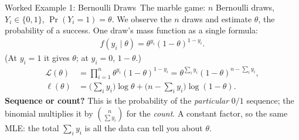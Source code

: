 \documentclass[aspectratio=169,11pt,xcolor=dvipsnames]{beamer}
\newcommand{\lik}{\mathcal{L}}
\newcommand{\loglik}{\ell}
\newcommand{\core}{\,\raisebox{0.6pt}{\textcolor{corestar}{$\bigstar$}}}
\begin{document}
\begin{frame}{Worked Example 1: Bernoulli Draws\core}
The marble game: $n$ Bernoulli draws, $Y_i \in \{0,1\}$,
$\Pr(Y_i=1)=\theta$. We observe the $n$ draws and estimate $\theta$, the
probability of a success. One draw's mass function as a single formula:
\begin{align*}
  f(y_i\mid\theta) = \theta^{y_i}(1-\theta)^{1-y_i} .
\end{align*}
(At $y_i = 1$ it gives $\theta$; at $y_i = 0$, $1-\theta$.)
\begin{align*}
  \lik(\theta)
  &= \prod_{i=1}^n \theta^{y_i}(1-\theta)^{1-y_i}
   = \theta^{\sum_i y_i}(1-\theta)^{n - \sum_i y_i} , \\[1pt]
  \loglik(\theta)
  &= \Big(\textstyle\sum_i y_i\Big)\log\theta
   + \Big(n - \textstyle\sum_i y_i\Big)\log(1-\theta) .
\end{align*}
\textbf{Sequence or count?} This is the probability of the \emph{particular}
$0/1$ sequence; the binomial multiplies it by $\binom{n}{\sum y_i}$ for the
\emph{count}. A constant factor, so the same MLE: \alert{the total
$\sum_i y_i$ is all the data can tell you about $\theta$}.
\end{frame}
\end{document}
